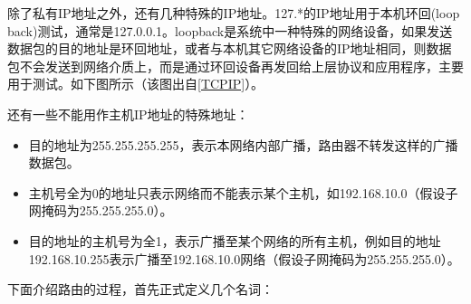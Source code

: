 除了私有IP地址之外，还有几种特殊的IP地址。127.\BookSplit{}*\BookSplit{}的IP地址用于本机环回(loop back)测试，通常是127.\BookSplit{}0.\BookSplit{}0.\BookSplit{}1。loopback是系统中一种特殊的网络设备，如果发送数据包的目的地址是环回地址，或者与本机其它网络设备的IP地址相同，则数据包不会发送到网络介质上，而是通过环回设备再发回给上层协议和应用程序，主要用于测试。如下图所示（该图出自\hyperlink{db.bi01.bibli.tcpip}{[TCPIP]}）。




还有一些不能用作主机IP地址的特殊地址：


\begin{itemize}

\item 目的地址为255.\BookSplit{}255.\BookSplit{}255.\BookSplit{}255，表示本网络内部广播，路由器不转发这样的广播数据包。

\item 主机号全为0的地址只表示网络而不能表示某个主机，如192.\BookSplit{}168.\BookSplit{}10.\BookSplit{}0（假设子网掩码为255.\BookSplit{}255.\BookSplit{}255.\BookSplit{}0）。

\item 目的地址的主机号为全1，表示广播至某个网络的所有主机，例如目的地址192.\BookSplit{}168.\BookSplit{}10.\BookSplit{}255表示广播至192.\BookSplit{}168.\BookSplit{}10.\BookSplit{}0网络（假设子网掩码为255.\BookSplit{}255.\BookSplit{}255.\BookSplit{}0）。
\end{itemize}


下面介绍路由的过程，首先正式定义几个名词：


